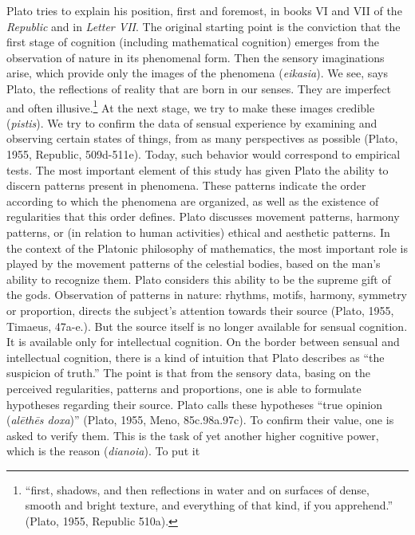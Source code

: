 \documentclass[a4paper]{article}
\begin{document}
Plato tries to explain his position, first and foremost, in books VI and VII of the \textit{Republic} and in
\textit{Letter VII}. The original starting point is the conviction that the first stage of cognition (including
mathematical cognition) emerges from the observation of nature in its phenomenal form. Then the sensory imaginations
arise, which provide only the images of the phenomena (\textit{eikasia}). We see, says Plato, the reflections of
reality that are born in our senses. They are imperfect and often illusive.\footnote{ “first, shadows, and then
reflections in water and on surfaces of dense, smooth and bright texture, and everything of that kind, if you
apprehend.” \label{ref:RND1JxaZbngpl}(Plato, 1955, Republic 510a).} At the next stage, we try to make these images
credible (\textit{pistis}). We try to confirm the data of sensual experience by examining and observing certain states
of things, from as many perspectives as possible \label{ref:RNDE93aAEVZ5r}(Plato, 1955, Republic, 509d-511e). Today,
such behavior would correspond to empirical tests. The most important element of this study %
has given Plato the ability to discern patterns present in phenomena. These patterns indicate the order according to
which the phenomena are\textbf{ }organized, as well as the existence of regularities that this order defines. Plato
discusses movement patterns, harmony patterns, or (in relation to human activities) ethical and aesthetic patterns. In
the context of the Platonic philosophy of mathematics, the most important role is played by the movement patterns of
the celestial bodies, based on the man’s ability to recognize them. Plato considers this ability to be the supreme gift
of the gods. Observation of patterns in nature: rhythms, motifs, harmony, symmetry or proportion, directs the subject’s
attention towards their source \label{ref:RNDnLWaOZKKpl}(Plato, 1955, Timaeus, 47a-e.). But the source itself is no
longer available for sensual cognition. It is available only for intellectual cognition. On the border between sensual
and intellectual cognition, there is a kind of intuition that Plato describes as “the suspicion of truth.” The point is
that from the sensory data, basing on the perceived regularities, patterns and proportions, one is able to formulate
hypotheses regarding their source. Plato calls these hypotheses “true opinion (\textit{al\=eth\=es doxa})”
\label{ref:RNDwzlgx2EGmj}(Plato, 1955, Meno, 85c.98a.97c). To confirm their value, one is asked to verify them. This is
the task of yet another higher cognitive power, which is the reason (\textit{dianoia}).\textcolor{black}{ }To put it
\end{document}
